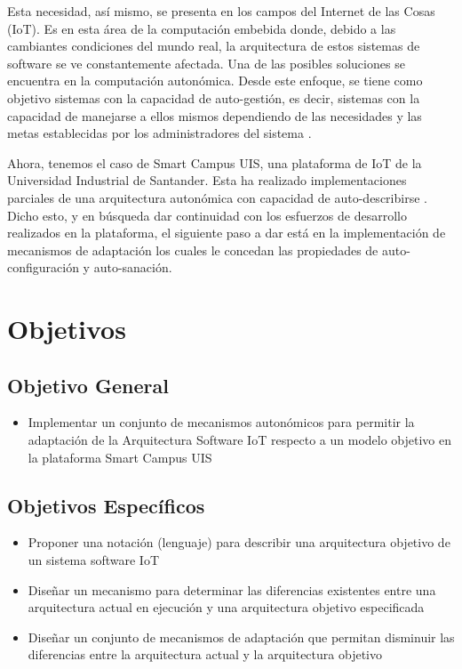 \documentclass[12pt]{article}
\begin{document}
    Esta necesidad, así mismo, se presenta en los campos del Internet de las Cosas (IoT). Es en esta área de la computación embebida donde, debido a las cambiantes condiciones del mundo real, la arquitectura de estos sistemas de software se ve constantemente afectada. Una de las posibles soluciones se encuentra en la computación autonómica. Desde este enfoque, se tiene como objetivo sistemas con la capacidad de auto-gestión, es decir, sistemas con la capacidad de manejarse a ellos mismos dependiendo de las necesidades y las metas establecidas por los administradores del sistema \cite{evaluation_2004}.
    
    Ahora, tenemos el caso de Smart Campus UIS, una plataforma de IoT de la Universidad Industrial de Santander. Esta ha realizado implementaciones parciales de una arquitectura autonómica con capacidad de auto-describirse \cite{henry_2020}. Dicho esto, y en búsqueda dar continuidad con los esfuerzos de desarrollo realizados en la plataforma, el siguiente paso a dar está en la implementación de mecanismos de adaptación los cuales le concedan las propiedades de auto-configuración y auto-sanación.

    \section{Objetivos}
    \subsection{Objetivo General}
    \begin{itemize}

        \item Implementar un conjunto de mecanismos autonómicos para permitir la adaptación de la Arquitectura Software IoT respecto a un modelo objetivo en la plataforma Smart Campus UIS

    \end{itemize}

    \subsection{Objetivos Específicos}

    \begin{itemize}
        \item Proponer una notación (lenguaje) para describir una arquitectura objetivo de un sistema software IoT
        \item Diseñar un mecanismo para determinar las diferencias existentes entre una arquitectura actual en ejecución y una arquitectura objetivo especificada
        \item Diseñar un conjunto de mecanismos de adaptación que permitan disminuir las diferencias entre la arquitectura actual y la arquitectura objetivo

    \end{itemize}
\end{document}
